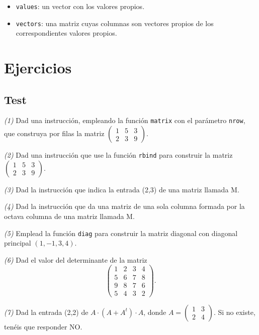 \documentclass[
]{book}
\providecommand{\tightlist}{%
  \setlength{\itemsep}{0pt}\setlength{\parskip}{0pt}}
\theoremstyle{definition}
\theoremstyle{definition}
\theoremstyle{definition}
\theoremstyle{remark}
\begin{document}
\begin{itemize}
  \begin{itemize}
  \tightlist
  \item
    \texttt{values}: un vector con los valores propios.
  \item
    \texttt{vectors}: una matriz cuyas columnas son vectores propios de los correspondientes valores propios.
  \end{itemize}
\end{itemize}

\hypertarget{ejercicios-3}{%
\section{Ejercicios}\label{ejercicios-3}}

\hypertarget{test-2}{%
\subsection*{Test}\label{test-2}}

\emph{(1)} Dad una instrucción, empleando la función \texttt{matrix} con el parámetro \texttt{nrow}, que construya por filas la matriz
\(\left(\begin{array}{ccc} 1 & 5 & 3\\ 2 & 3 & 9\end{array} \right)\).

\emph{(2)} Dad una instrucción que use la función \texttt{rbind} para construir la matriz
\(\left(\begin{array}{ccc} 1 & 5 & 3\\ 2 & 3 & 9\end{array} \right)\).

\emph{(3)} Dad la instrucción que indica la entrada (2,3) de una matriz llamada M.

\emph{(4)} Dad la instrucción que da una matriz de una sola columna formada por la octava columna de una matriz llamada M.

\emph{(5)} Emplead la función \texttt{diag} para construir la matriz diagonal con diagonal principal \((1,-1,3,4)\).

\emph{(6)} Dad el valor del determinante de la matriz \[\left(\begin{array}{cccc}
1 & 2 & 3 & 4\\ 5 & 6 & 7 & 8 \\ 9 & 8 & 7 & 6\\ 5 & 4 & 3 & 2\end{array} \right).\]

\emph{(7)} Dad la entrada (2,2) de \(A\cdot (A+ A^t)\cdot A\), donde \(A=\left(\begin{array}{cc} 1 & 3 \\ 2 & 4 \end{array} \right)\). Si no existe, tenéis que responder NO.
\end{document}
